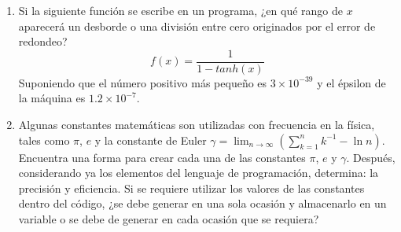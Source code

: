 \documentclass[11pt]{article}
\begin{document}
\begin{enumerate}
\item Si la siguiente funci\'{o}n se escribe en un programa, ¿en qu\'{e} rango de $x$ aparecer\'{a} un desborde o una divisi\'{o}n entre cero originados por el error de redondeo?
\[ f(x)=\dfrac{1}{1-tanh(x)} \]
Suponiendo que el número positivo m\'{a}s pequeño es $3 \times 10^{-39}$  y el \'{e}psilon de la m\'{a}quina es $1.2 \times 10^{-7}$.
\item Algunas constantes matem\'{a}ticas son utilizadas con frecuencia en la f\'{i}sica, tales como $\pi$, $e$ y la constante de Euler $\gamma = \lim_{n\rightarrow \infty} (\sum_{k=1}^{n} k^{-1} - \ln n)$. Encuentra una forma para crear cada una de las constantes $\pi$, $e$ y $\gamma$. Despu\'{e}s, considerando ya los elementos del lenguaje de programaci\'{o}n, determina: la precisi\'{o}n y eficiencia. Si se requiere utilizar los valores de las constantes dentro del c\'{o}digo, ¿se debe generar en una sola ocasi\'{o}n y almacenarlo en un variable o se debe de generar en cada ocasi\'{o}n que se requiera?

\end{enumerate}
\end{document}
